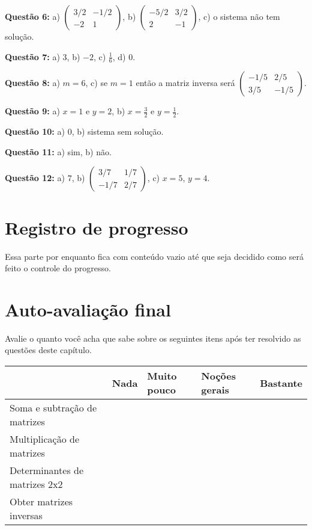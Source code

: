 \documentclass[main_estudante.tex]{subfiles}
\begin{document}
\noindent\textbf{Questão 6:} a) $\begin{pmatrix} 3/2 & -1/2 \\ -2 & 1\end{pmatrix}$, b) $\begin{pmatrix} -5/2 & 3/2 \\ 2 & -1\end{pmatrix}$, c) o sistema não tem solução.

\noindent\textbf{Questão 7:} a) $3$, b) $-2$, c) $\frac{1}{6}$, d) $0$.

\noindent\textbf{Questão 8:} a) $m=6$, c) se $m=1$ então a matriz inversa será $\begin{pmatrix} -1/5 & 2/5 \\ 3/5 & -1/5 \end{pmatrix}$.

\noindent\textbf{Questão 9:} a) $x=1$ e $y=2$, b) $x=\frac{3}{2}$ e $y=\frac{1}{2}$.

\noindent\textbf{Questão 10:} a) $0$, b) sistema sem solução.

\noindent\textbf{Questão 11:} a) sim, b) não.

\noindent\textbf{Questão 12:} a) $7$, b) $\begin{pmatrix} 3/7 & 1/7 \\ -1/7 & 2/7 \end{pmatrix}$, c) $x=5$, $y=4$.

\section{Registro de progresso}

Essa parte por enquanto fica com conteúdo vazio até que seja decidido como será feito o controle do progresso.
\vspace{5cm}

\section{Auto-avaliação final}
Avalie o quanto você acha que sabe sobre os seguintes itens após ter resolvido as questões deste capítulo.

\begin{center}
 \begin{tabular}{|p{35mm}||p{15mm}|p{15mm}|p{15mm}|p{15mm}|} 
 \hline
   & Nada & Muito pouco & Noções gerais & Bastante\\
 \hline
 Soma e subtração de matrizes &  &  &  &  \\ 
 \hline
 Multiplicação de matrizes &  &  &  &  \\
 \hline
 Determinantes de matrizes 2x2 &  &  &  &  \\
 \hline
 Obter matrizes inversas &  &  &  &  \\
 \hline
\end{tabular}
\end{center}
\end{document}
